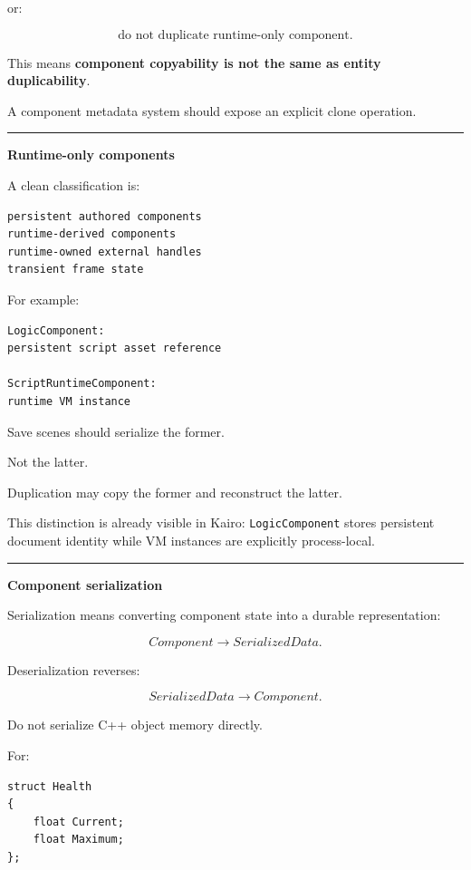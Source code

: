or:

\[
\text{do not duplicate runtime-only component}.
\]

This means \textbf{component copyability is not the same as entity duplicability}.

A component metadata system should expose an explicit clone operation.

\begin{center}\rule{0.5\linewidth}{0.5pt}\end{center}

\textbf{Runtime-only components}

A clean classification is:

\begin{verbatim}
persistent authored components
runtime-derived components
runtime-owned external handles
transient frame state
\end{verbatim}

For example:

\begin{verbatim}
LogicComponent:
persistent script asset reference

ScriptRuntimeComponent:
runtime VM instance
\end{verbatim}

Save scenes should serialize the former.

Not the latter.

Duplication may copy the former and reconstruct the latter.

This distinction is already visible in Kairo: \texttt{LogicComponent} stores persistent document identity while VM instances are explicitly process-local.

\begin{center}\rule{0.5\linewidth}{0.5pt}\end{center}

\textbf{Component serialization}

Serialization means converting component state into a durable representation:

\[
Component
\rightarrow
SerializedData.
\]

Deserialization reverses:

\[
SerializedData
\rightarrow
Component.
\]

Do not serialize C++ object memory directly.

For:

\begin{verbatim}
struct Health
{
    float Current;
    float Maximum;
};
\end{verbatim}


